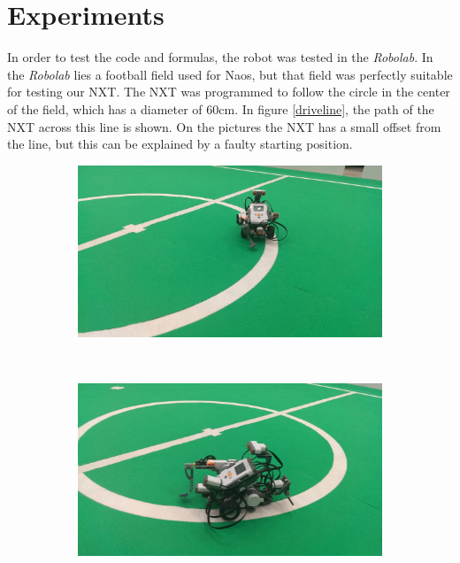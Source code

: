 \documentclass[12pt]{article}
\begin{document}
\section{Experiments}
In order to test the code and formulas, the robot was tested in the \textit{Robolab}. In the \textit{Robolab} lies a football field used for Naos, but that field was perfectly suitable for testing our NXT. The NXT was programmed to follow the circle in the center of the field, which has a diameter of 60cm. In figure \ref{driveline}, the path of the NXT across this line is shown. On the pictures the NXT has a small offset from the line, but this can be explained by a faulty starting position. \\
\begin{figure}[h!]
    \centering
    \begin{subfigure}[b]{0.3333\textwidth}
            \includegraphics[width=\textwidth]{lijn1.jpg}
    \end{subfigure}%
    ~ 
    \begin{subfigure}[b]{0.3333\textwidth}
            \includegraphics[width=\textwidth]{lijn2.jpg}
    \end{subfigure}

\end{figure}
\end{document}

